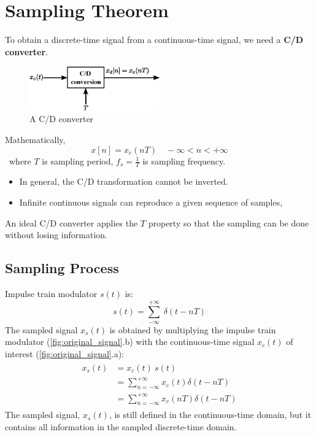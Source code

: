 \section{Sampling Theorem}

To obtain a discrete-time signal from a continuous-time signal, we need a \textbf{C/D converter}.
 \begin{figure}[H]
     \centering
     \includegraphics[width = 0.5\textwidth]{images/CD_converter.eps}
     \caption{A C/D converter} 
 \end{figure}
Mathematically,
\[ x[n] = x_{c}(nT) \quad -\infty < n < +\infty \]
\ where $T$ is sampling period, $f_{s} = \frac{1}{T}$ is sampling frequency. 
\begin{itemize}
\item In general, the C/D transformation cannot be inverted.
\item Infinite continuous signals can reproduce a given sequence of samples,
\end{itemize}
An ideal C/D converter applies the $T$ property so that the sampling can be done without losing information. 

\subsection{Sampling Process}
Impulse train modulator $s(t)$ is: 
\[ s(t) = \sum_{-\infty}^{+\infty} \ \delta(t-nT) \]
The sampled signal $x_{s}(t)$ is obtained by multiplying the impulse train modulator (\autoref{fig:original_signal}.b) with the continuous-time signal $x_{c}(t)$ of interest (\autoref{fig:original_signal}.a):
\begin{align*} 
\begin{split}
x_{s}(t) &= x_{c}(t) \ s(t)\\
&= \sum_{n=-\infty}^{+\infty} x_{c}(t) \delta(t-nT)\\
&= \sum_{n=-\infty}^{+\infty} x_{c}(nT) \delta(t-nT)
\end{split}
\end{align*}
The sampled signal, $x_{s}(t)$, is still defined in the continuous-time domain, but it contains all information in the sampled discrete-time domain.\\\\

